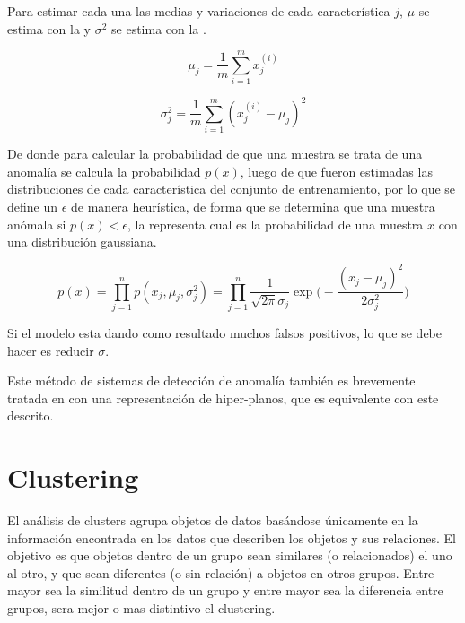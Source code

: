 Para estimar cada una las medias y variaciones de cada característica $j$, $\mu$ se estima con la  y $\sigma^2$ se estima con la .

\begin{equation} \label{eq:anomaly-mu}
  \mu_j = \frac{1}{m} \sum_{i=1}^{m} x_j^{(i)}
\end{equation}

\begin{equation} \label{eq:anomaly-sigma}
  \sigma_j^2 = \frac{1}{m} \sum_{i=1}^{m} (x_j^{(i)} - \mu_j)^2
\end{equation}

De donde para calcular la probabilidad de que una muestra se trata de una anomalía se calcula la probabilidad $p(x)$, luego de que fueron estimadas las distribuciones de cada característica del conjunto de entrenamiento, por lo que se define un $\epsilon$ de manera heurística, de forma que se determina que una muestra anómala si $p(x) < \epsilon$, la  representa cual es la probabilidad de una muestra $x$ con una distribución gaussiana.

\begin{equation} \label{eq:anomaly-prob}
  p(x) = \prod_{j=1}^{n}p(x_j, \mu_j, \sigma_j^2) = \prod_{j=1}^{n} \frac{1}{\sqrt{2\pi}\sigma_j} \exp\Bigg( - \frac{(x_j-\mu_j)^2}{2\sigma_j^2}\Bigg)
\end{equation}

Si el modelo esta dando como resultado muchos falsos positivos, lo que se debe hacer es reducir $\sigma$.

Este método de sistemas de detección de anomalía también es brevemente tratada en \cite{osint} con una representación de hiper-planos, que es equivalente con este descrito.


\section{Clustering} \label{subsec:clustering}
El análisis de clusters agrupa objetos de datos basándose únicamente en la información encontrada en los datos que describen los objetos y sus relaciones. El objetivo es que objetos dentro de un grupo sean similares (o relacionados) el uno al otro, y que sean diferentes (o sin relación) a objetos en otros grupos. Entre mayor sea la similitud dentro de un grupo y entre mayor sea la diferencia entre grupos, sera mejor o mas distintivo el clustering.

